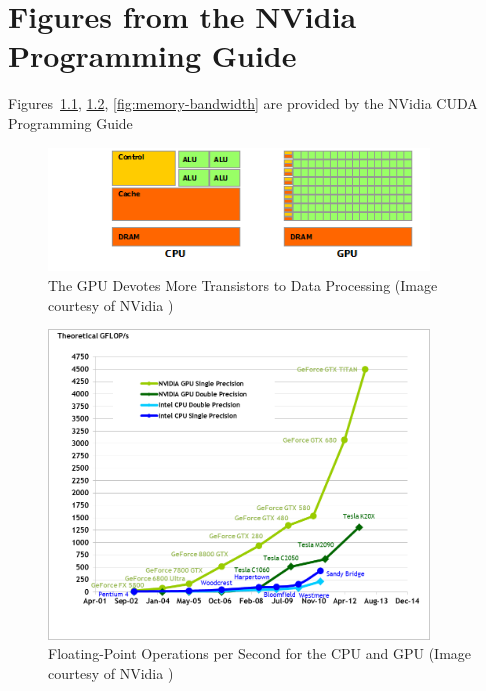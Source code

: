 \chapter{Figures from the NVidia Programming Guide}

Figures~\ref{fig:gpu-devotes-more-transistors-to-data-processing}, \ref{fig:floating-point-operations-per-second}, \ref{fig:memory-bandwidth} are provided by the NVidia CUDA Programming Guide \cite{CudaGuide2013}

\begin{figure}
\centering
\includegraphics[width=0.9\textwidth]{gpu_content/nvidia_figures/gpu-devotes-more-transistors-to-data-processing.png}
\caption{The GPU Devotes More Transistors to Data Processing (Image courtesy of NVidia \cite{CudaGuide2013})} 
\label{fig:gpu-devotes-more-transistors-to-data-processing}
\end{figure}

\begin{figure}
\centering
\includegraphics[width=0.9\textwidth]{gpu_content/nvidia_figures/floating-point-operations-per-second.png}
\caption{Floating-Point Operations per Second for the CPU and GPU (Image courtesy of NVidia \cite{CudaGuide2013})} 
\label{fig:floating-point-operations-per-second}
\end{figure}

